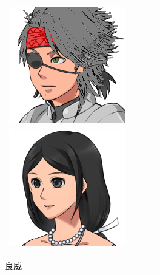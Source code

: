\begin{figure}[b]
\begin{tabular}{cccc}
\begin{minipage}{0.2\textwidth}\includegraphics[width=\textwidth]{./jumpakuasset/D.png}\caption{出井}\label{fig:jumpakuD}\end{minipage}\\
\begin{minipage}{0.2\textwidth}\includegraphics[width=\textwidth]{./jumpakuasset/E.png}\caption{良威}\label{fig:jumpakuE}\end{minipage}

\end{tabular}
\end{figure}
